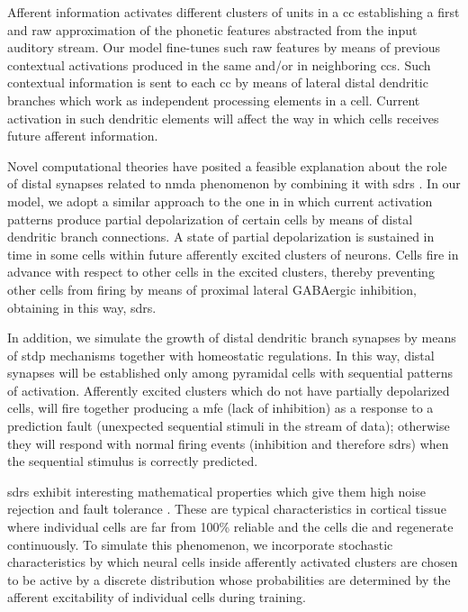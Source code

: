 \documentclass[10pt,letterpaper]{article}
\begin{document}
Afferent information activates different clusters of units in a \gls{cc} establishing a first and raw approximation of the phonetic features abstracted from the input auditory stream. Our model fine-tunes such raw features by means of previous contextual activations produced in the same and/or in neighboring \glspl{cc}. Such contextual information is sent to each \gls{cc} by means of lateral distal dendritic branches which work as independent processing elements in a cell. Current activation in such dendritic elements will affect the way in which cells receives future afferent information.

Novel computational theories have posited a feasible explanation about the role of distal synapses related to \gls{nmda}
phenomenon \cite{hawkins_2016} by combining it with \glspl{sdr} \cite{ahmad_2016}. In our model, we adopt a similar approach to the one in \cite{hawkins_2016} in which current activation patterns produce partial depolarization of certain cells by means of distal dendritic branch connections. A state of partial depolarization is sustained in time in some cells within
future afferently excited clusters of neurons. Cells fire in advance with respect to other cells in the excited clusters, thereby preventing other cells from firing by means of proximal lateral GABAergic inhibition, obtaining in this way, \glspl{sdr}.

In addition, we simulate the growth of distal dendritic branch synapses by means of \gls{stdp} mechanisms together with
homeostatic regulations. In this way, distal synapses will be established only among pyramidal cells with sequential patterns
of activation. Afferently excited clusters which do not have partially depolarized cells,
will fire together producing a \gls{mfe}
(lack of inhibition) as a response to a prediction fault (unexpected sequential stimuli in the stream of data); otherwise they will respond with normal firing events (inhibition and therefore \glspl{sdr}) when the sequential stimulus is
correctly predicted.

\glspl{sdr} exhibit interesting mathematical properties which give them high noise rejection and fault tolerance \cite{ahmad_2015}.
These are typical characteristics in cortical tissue where individual cells are far from 100\% reliable and the cells die and regenerate continuously. To simulate this phenomenon, we incorporate stochastic characteristics by which neural cells inside afferently activated clusters are chosen to be active by a discrete distribution whose probabilities are determined by the afferent excitability of individual cells during training.
\end{document}

